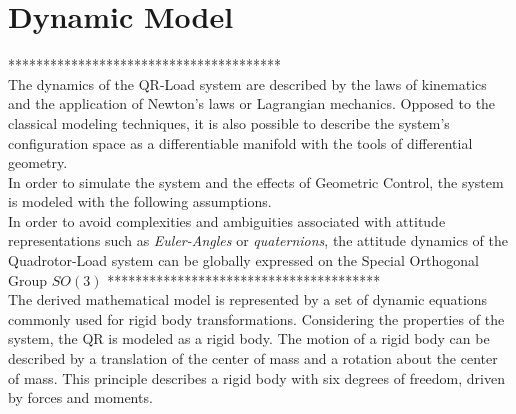 \chapter{Dynamic Model} \label{ch:model}

***************************************\\

The dynamics of the QR-Load system are described by the laws of kinematics and the application of Newton's laws or Lagrangian mechanics. Opposed to the classical modeling techniques, it is also possible to describe the system's configuration space as a differentiable manifold with the tools of differential geometry. \\

In order to simulate the system and the effects of Geometric Control, the system is modeled with the following assumptions.\\

In order to avoid complexities and ambiguities associated with attitude representations such as \textit{Euler-Angles} or \textit{quaternions}, the attitude dynamics of the Quadrotor-Load system can be globally expressed on the Special Orthogonal Group $SO(3)$
***************************************\\

The derived mathematical model is represented by a set of dynamic equations commonly used for rigid body transformations. Considering the properties of the system, the QR is modeled as a rigid body. The motion of a rigid body can be described by a translation of the center of mass and a rotation about the center of mass. This principle describes a rigid body with six degrees of freedom, driven by forces and moments. \\


